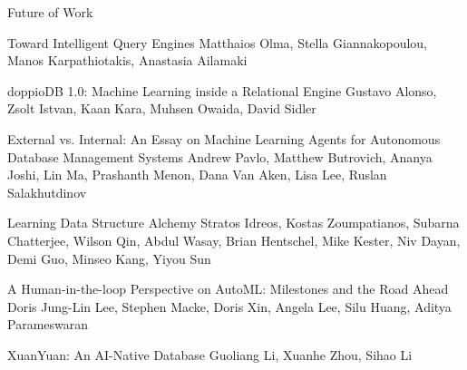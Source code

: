 \documentclass[11pt]{article}
\begin{document}
\begin{bulletin}
\begin{articlesection}{Future of Work}
%
%
%
\begin{article}
{Toward Intelligent Query Engines}
{Matthaios Olma,  Stella Giannakopoulou,  Manos Karpathiotakis, Anastasia Ailamaki}
\graphicspath{{submissions/adaptivedb/}}

\end{article}


\begin{article}
{doppioDB 1.0: Machine Learning inside a Relational Engine}
{Gustavo Alonso, Zsolt Istvan, Kaan Kara, Muhsen Owaida, David Sidler}
\graphicspath{{submissions/gustavo/}}

\end{article}


\begin{article}
{External vs. Internal: An Essay on  Machine Learning Agents for  Autonomous Database Management Systems}
{Andrew Pavlo, Matthew Butrovich, Ananya Joshi, Lin Ma, Prashanth 
Menon, Dana Van Aken, Lisa Lee, Ruslan Salakhutdinov}
\graphicspath{{submissions/selfdriving/}}

\end{article}



\begin{article}
{Learning Data Structure Alchemy}
{Stratos Idreos, 
Kostas Zoumpatianos, 
Subarna Chatterjee, 
Wilson Qin,
Abdul Wasay,
Brian Hentschel, 
Mike Kester,
Niv Dayan,
Demi Guo,
Minseo Kang,
Yiyou Sun
}
\graphicspath{{submissions/Learning/}}

\end{article}



\begin{article}
{A Human-in-the-loop Perspective on AutoML: Milestones and the Road Ahead}
{Doris Jung-Lin Lee, Stephen Macke, Doris Xin, Angela Lee, Silu Huang, Aditya Parameswaran}
\graphicspath{{submissions/automl/}}

\end{article}

\begin{article}
{XuanYuan: An AI-Native Database}
{Guoliang Li, Xuanhe Zhou, Sihao Li}
\graphicspath{{submissions/ainative/}}

\end{article}




\end{articlesection}
\end{bulletin}
\end{document}
